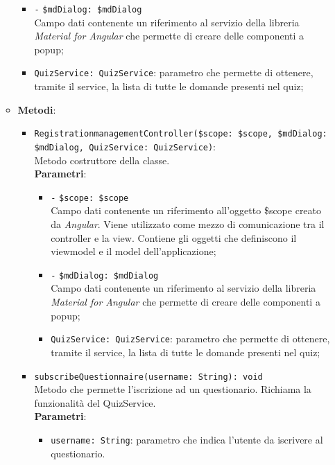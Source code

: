 \begin{itemize}
\begin{itemize}
\begin{itemize}
		\item \texttt{-} \texttt{\$mdDialog: \$mdDialog} \\
		Campo dati contenente un riferimento al servizio della libreria \textit{Material for Angular} che permette di creare delle componenti a popup;
		\item \texttt{QuizService: QuizService}: parametro che permette di ottenere, tramite il service, la lista di tutte le domande presenti nel quiz;
	\end{itemize}
	\item \textbf{Metodi}:
	\begin{itemize}
		\item \texttt{RegistrationmanagementController(\$scope: \$scope, \$mdDialog: \$mdDialog, QuizService: QuizService)}: \\Metodo costruttore della classe. \\
			\textbf{Parametri}:
			\begin{itemize}
					\item \texttt{-} \texttt{\$scope: \$scope} \\
					Campo dati contenente un riferimento all’oggetto \$scope creato da \textit{Angular}. Viene utilizzato come mezzo di comunicazione tra il controller e la view. Contiene gli oggetti che definiscono il viewmodel e il model dell’applicazione;
					\item \texttt{-} \texttt{\$mdDialog: \$mdDialog} \\
					Campo dati contenente un riferimento al servizio della libreria \textit{Material for Angular} che permette di creare delle componenti a popup;
					\item \texttt{QuizService: QuizService}: parametro che permette di ottenere, tramite il service, la lista di tutte le domande presenti nel quiz; 
			\end{itemize}
		\item \texttt{subscribeQuestionnaire(username: String): void} \\ Metodo che permette l'iscrizione ad un questionario. Richiama la funzionalità del QuizService. \\
		\textbf{Parametri}:
		\begin{itemize}
			\item \texttt{username: String}: parametro che indica l'utente da iscrivere al questionario.
		\end{itemize}
	\end{itemize}
\end{itemize}


\end{itemize}
